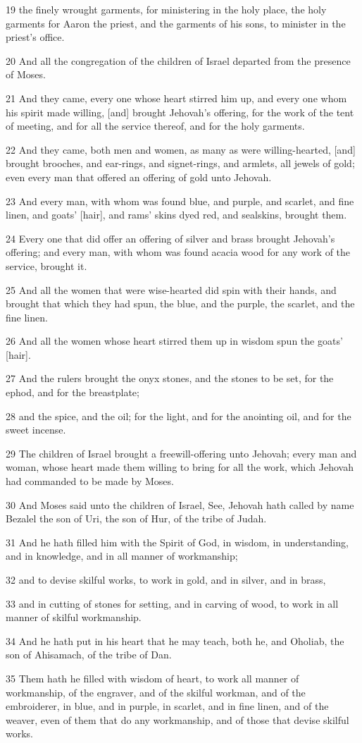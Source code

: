 \par 19 the finely wrought garments, for ministering in the holy place, the holy garments for Aaron the priest, and the garments of his sons, to minister in the priest's office.
\par 20 And all the congregation of the children of Israel departed from the presence of Moses.
\par 21 And they came, every one whose heart stirred him up, and every one whom his spirit made willing, [and] brought Jehovah's offering, for the work of the tent of meeting, and for all the service thereof, and for the holy garments.
\par 22 And they came, both men and women, as many as were willing-hearted, [and] brought brooches, and ear-rings, and signet-rings, and armlets, all jewels of gold; even every man that offered an offering of gold unto Jehovah.
\par 23 And every man, with whom was found blue, and purple, and scarlet, and fine linen, and goats' [hair], and rams' skins dyed red, and sealskins, brought them.
\par 24 Every one that did offer an offering of silver and brass brought Jehovah's offering; and every man, with whom was found acacia wood for any work of the service, brought it.
\par 25 And all the women that were wise-hearted did spin with their hands, and brought that which they had spun, the blue, and the purple, the scarlet, and the fine linen.
\par 26 And all the women whose heart stirred them up in wisdom spun the goats' [hair].
\par 27 And the rulers brought the onyx stones, and the stones to be set, for the ephod, and for the breastplate;
\par 28 and the spice, and the oil; for the light, and for the anointing oil, and for the sweet incense.
\par 29 The children of Israel brought a freewill-offering unto Jehovah; every man and woman, whose heart made them willing to bring for all the work, which Jehovah had commanded to be made by Moses.
\par 30 And Moses said unto the children of Israel, See, Jehovah hath called by name Bezalel the son of Uri, the son of Hur, of the tribe of Judah.
\par 31 And he hath filled him with the Spirit of God, in wisdom, in understanding, and in knowledge, and in all manner of workmanship;
\par 32 and to devise skilful works, to work in gold, and in silver, and in brass,
\par 33 and in cutting of stones for setting, and in carving of wood, to work in all manner of skilful workmanship.
\par 34 And he hath put in his heart that he may teach, both he, and Oholiab, the son of Ahisamach, of the tribe of Dan.
\par 35 Them hath he filled with wisdom of heart, to work all manner of workmanship, of the engraver, and of the skilful workman, and of the embroiderer, in blue, and in purple, in scarlet, and in fine linen, and of the weaver, even of them that do any workmanship, and of those that devise skilful works.

